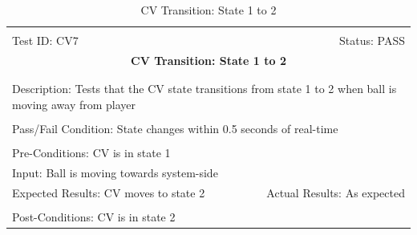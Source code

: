 \documentclass[11pt]{article}
\begin{document}
\begin{center}
\begin{table}[H]
\begin{tabular}{|l r|}\hline&\\[-2mm]
	Test ID: CV7	&Status: PASS\\[-3mm]
	\multicolumn{2}{|c|}{\textbf{\large{CV Transition: State 1 to 2}}}\\&\\\hline&\\[-3mm]
	\multicolumn{2}{|p{\textwidth}|}{Description: Tests that the CV state transitions from state 1 to 2 when ball is moving away from player}\\[1mm]\hline&\\[-3mm]
	\multicolumn{2}{|p{\textwidth}|}{Pass/Fail Condition: State changes within 0.5 seconds of real-time}\\[1mm]\hline&\\[-3mm]
	\multicolumn{2}{|p{\textwidth}|}{Pre-Conditions: CV is in state 1}\\[4mm]
	\multicolumn{2}{|p{\textwidth}|}{Input: Ball is moving towards system-side}\\[2mm]\hline
	\multicolumn{1}{|p{0.49\textwidth}}{Expected Results: CV moves to state 2}	&\multicolumn{1}{|p{0.45\textwidth}|}{Actual Results: As expected}\\\hline&\\[-3mm]
	\multicolumn{2}{|p{\textwidth}|}{Post-Conditions: CV is in state 2}\\\hline
\end{tabular}
\caption{CV Transition: State 1 to 2}
\end{table}
\end{center}
\end{document}
